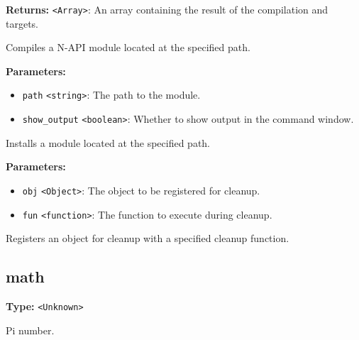 \documentclass[12pt,a4paper]{article}
\begin{document}
\noindent \textbf{Returns:} \texttt{<Array>}: An array containing the result of the compilation and targets.

\noindent Compiles a N-API module located at the specified path.

\vspace{5mm}
\noindent {}


\noindent \textbf{Parameters:}
\begin{itemize}
  \item \texttt{path} \texttt{<string>}: The path to the module.
  \item \texttt{show\_output} \texttt{<boolean>}: Whether to show output in the command window.
\end{itemize}

\noindent Installs a module located at the specified path.

\vspace{5mm}
\noindent {}


\noindent \textbf{Parameters:}
\begin{itemize}
  \item \texttt{obj} \texttt{<Object>}: The object to be registered for cleanup.
  \item \texttt{fun} \texttt{<function>}: The function to execute during cleanup.
\end{itemize}

\noindent Registers an object for cleanup with a specified cleanup function.


\subsection{math}
\vspace{5mm}
\noindent {}\vspace{4mm}


\noindent \textbf{Type:} \texttt{<Unknown>}

\noindent Pi number.

\vspace{5mm}
\noindent {}\vspace{4mm}
\end{document}
